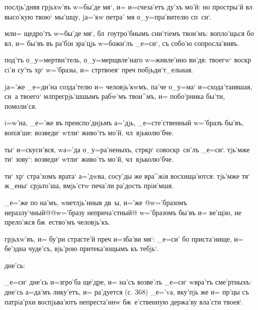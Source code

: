 {{

  послjь'дняя грjьхw'въ w=бы'де 
мя`, и= и=счеза'етъ ду'хъ мо'й: но простры'й вл 
высо'кую твою` мы'шцу, jа='кw петра' мя о_у=пра'вителю 
сп~си`.

 мл и= щедро'тъ w=бы'де мя`, 
бл~гоутро'бнымъ сни'тiемъ твои'мъ: вопло'щься бо вл, 
и= бы'въ въ ра'бiи зра'цjь w=божи'лъ _е=си`, съ собо'ю 
сопросла'вивъ.

 под'тъ о_у=мертви'тель, 
о_у=мерщвле'наго w=живле'нно ви'дя: твоегw` воскр 
сi'и су'ть хр` w='бразы, и= стр твоея` преч 
побjьди'т_ельная.

  jа='же _е=ди'на 
созда'телю и= человjь'кwмъ, па'че о_у=ма` 
и=схода'таившая, сн~а твоего` мл прегрjь'шшымъ 
рабw'мъ твои^мъ, и= побо'рника бы'ти, помоли'ся.


  i=w'на, _е='же въ 
преиспо'днjьмъ а='дjь, _е=сте'ственный w='бразъ бы'въ, 
вопiя'ше: возведи` w\т тли` живо'тъ мо'й, чл~вjьколю'бче.

 ты` и=скуси'вся, w\т а='да о_у=ра'неныхъ, 
стр кр` совоскр~си'лъ _е=си`. тjь'мже ти` зову`: 
возведи` w\т тли` живо'тъ мо'й, чл~вjьколю'бче.

 ти` хр` стра'хомъ врата` 
а='дwва, сосу'ды же вра^жiя восхища'ются: тjь'мже тя` 
ж_ены` срjьто'ша, вмjь'стw печа'ли ра'дость прiи'мшя.


 _е='же по на'мъ, w\т нетлjь'нныя 
дв~ы, и='же @w='бразомъ неразлу'чный@{@w='бразу 
неприча'стный@} w='бразомъ бы'въ и= ве'щiю, не прело'жся 
бж~ество'мъ человjь'къ.

 грjьхw'въ, и= бу'ри страсте'й преч 
и=зба'ви мя`: _е=си' бо приста'нище, и= бе'здна чуде'съ, 
вjь'рою притека'ющымъ къ тебjь`.

     дне'сь:

 _е=си` дне'сь и=з\ъ гро'ба ще'дре, и= 
на'съ возве'лъ _е=си` w\т вра'тъ сме'ртныхъ: дне'сь 
а=да'мъ лику'етъ, и= ра'дуется (с. 368) _е='vа, вку'пjь 
же и= пр'цы съ патрiа'рхи воспjьва'ютъ непреста'ннw 
бж~е'ственную держа'ву вла'сти твоея`.

}}
